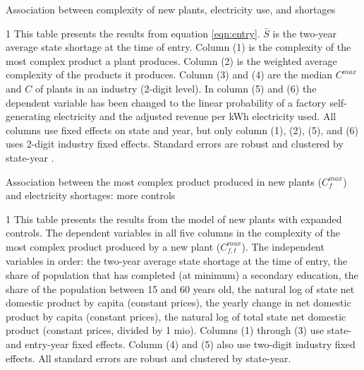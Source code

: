 \documentclass[11pt]{article}
\begin{document}
\begin{table}[H]
	\begin{center}
		\begin{threeparttable}
			\caption{Association between complexity of new plants, electricity use, and shortages}
			\label{tab:entry_min}
			
			\begin{tablenotes} \footnotesize 
			\item[1] This table presents the results from equation \ref{eqn:entry}. $\bar{S}$ is the two-year average state shortage at the time of entry. Column (1) is the complexity of the most complex product a plant produces. Column (2) is the weighted average complexity of the products it produces. Column (3) and (4) are the median $C^{max}$ and $C$ of plants in an industry (2-digit level). In column (5) and (6) the dependent variable has been changed to the linear probability of a factory self-generating electricity and the adjusted revenue per kWh electricity used. All columns use fixed effects on state and year, but only column (1), (2), (5), and (6) uses 2-digit industry fixed effects. Standard errors are robust and clustered by state-year .
			\end{tablenotes}
		\end{threeparttable}
	\end{center}
\end{table}   


\begin{table}[H]
	\begin{center}
		\begin{threeparttable}
			\caption{Association between the most complex product produced in new plants ($C^{max}_{f}$) and electricity shortages: more controls}
			\label{tab:entry_max_max}
			
			\begin{tablenotes} \footnotesize 
			\item[1] This table presents the results from the model of new plants with expanded controls. The dependent variables in all five columns in the complexity of the most complex product produced by a new plant ($C^{max}_{f,t}$). The independent variables in order: the two-year average state shortage at the time of entry, the share of population that has completed (at minimum) a secondary education, the share of the population between 15 and 60 years old, the natural log of state net domestic product by capita (constant prices), the yearly change in net domestic product by capita (constant prices), the natural log of total state net domestic product (constant prices, divided by 1 mio). Columns (1) through (3) use state- and entry-year fixed effects. Column (4) and (5) also use two-digit industry fixed effects. All standard errors are robust and clustered by state-year.
			\end{tablenotes}
		\end{threeparttable}
	\end{center}
\end{table}   
\end{document}
